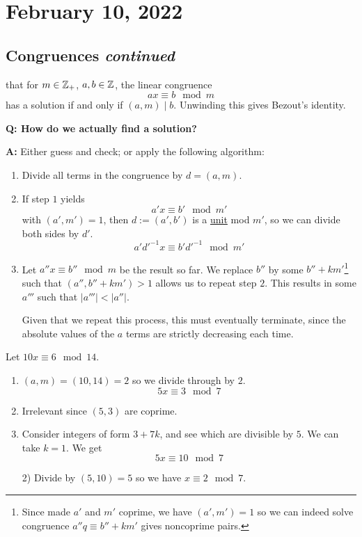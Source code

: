 \section{February 10, 2022}

\subsection{Congruences \emph{continued}}
\recall that for $m\in\mathbb Z_+$, $a,b\in \mathbb Z$, the linear congruence
\[ax\equiv b\mod{m}\]
has a solution if and only if $(a, m)\mid b$. Unwinding this gives Bezout's identity.

\textbf{Q: How do we actually find a solution?}

\textbf{A:} Either guess and check; or apply the following algorithm:
\begin{enumerate}[1)]
    \item Divide all terms in the congruence by $d = (a, m)$.
    \item If step $1$ yields
          \[a'x\equiv b'\mod m'\]
          with $(a', m') = 1$, then $d:= (a', b')$ is a \ul{unit} mod $m'$, so we can divide both sides by $d'$.
          \[a'd'^{-1}x\equiv b'd'^{-1}\mod m'\]
    \item Let $a''x\equiv b''\mod m$ be the result so far. We replace $b''$ by some $b''+km'$\footnote{Since made $a'$ and $m'$ coprime, we have $(a', m')=1$ so we can indeed solve congruence $a''q \equiv b''+km'$ gives noncoprime pairs.} such that $(a'', b''+km')>1$ allows us to repeat step $2$. This results in some $a'''$ such that $|a'''| < |a''|$.

          Given that we repeat this process, this must eventually terminate, since the absolute values of the $a$ terms are strictly decreasing each time.
\end{enumerate}
\begin{example}
    Let $10x\equiv 6\mod{14}$.

    \begin{enumerate}[1)]
        \item $(a, m) = (10, 14) = 2$ so we divide through by $2$. \[5x\equiv 3\mod{7}\]
        \item Irrelevant since $(5, 3)$ are coprime.
        \item Consider integers of form $3+7k$, and see which are divisible by $5$. We can take $k=1$. We get
              \[5x\equiv 10\mod 7\]
        \item[2)] Divide by $(5, 10) = 5$ so we have $x\equiv 2\mod{7}$.
    \end{enumerate}
\end{example}

